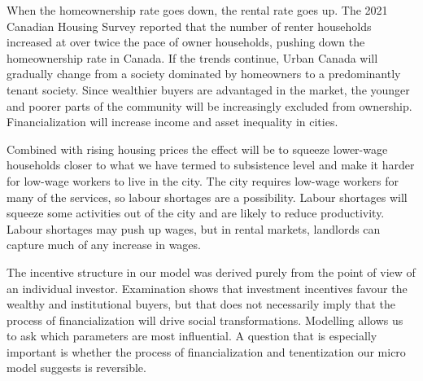 When the homeownership rate goes down, the rental rate goes up. The 2021 Canadian Housing Survey reported that the number of renter households increased  at over twice the pace of owner households, pushing down the homeownership rate in Canada. If the trends continue, Urban Canada will gradually change from a society dominated by homeowners to a predominantly tenant society. Since wealthier buyers are advantaged in the market, the younger and poorer parts of the community will be increasingly excluded from ownership. Financialization will increase income and asset inequality in cities.

Combined with rising housing prices the effect will be to squeeze lower-wage households closer to what we have termed to subsistence level and make it harder for low-wage workers to live in the city. The city requires low-wage workers for many of the services, so labour shortages are a possibility. Labour shortages will squeeze some activities out of the city and are likely to reduce productivity. Labour shortages may push up wages, but in rental markets, landlords can capture much of any increase in wages. 

The incentive structure in our model was derived purely from the point of view of an individual investor. Examination shows that investment incentives favour the wealthy and institutional buyers, but that does not necessarily imply that the process of financialization will drive social transformations. %
Modelling  allows us to ask %
which parameters are most influential. 
A question that is especially important is whether the process of financialization and tenentization our micro model suggests is reversible.%



